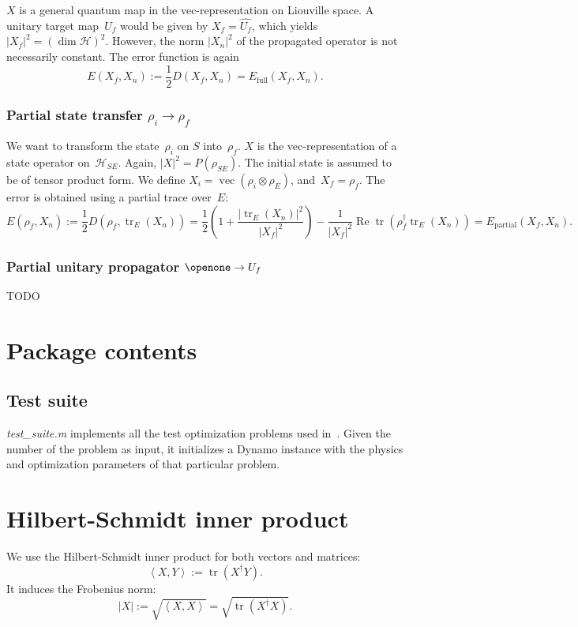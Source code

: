 \documentclass[aps, pra, a4paper, longbibliography]{revtex4}
\newcommand{\I}{\openone}
\newcommand{\be}{\begin{equation}}
\newcommand{\ee}{\end{equation}}
\newcommand{\inprod}[2]{\left\langle #1, #2 \right\rangle}
\newcommand{\hilb}[1]{\mathcal{#1}}
\DeclareMathOperator{\tr}{tr}
\DeclareMathOperator{\re}{Re}
\DeclareMathOperator{\cvec}{vec}
\begin{document}
$X$ is a general quantum map in the vec-representation on Liouville space.
A unitary target map~$U_f$ would be given by
$X_f = \hat{U_f}$, which yields $|X_f|^2 = (\dim \hilb{H})^2$.
However, the norm $|X_n|^2$ of the propagated operator
is not necessarily constant. The error function is again
\be
E(X_f, X_n)
:= \frac{1}{2} D(X_f, X_n)
= E_\text{full}(X_f, X_n).
\ee


\subsubsection{Partial state transfer $\rho_i \to \rho_f$}

We want to transform the state~$\rho_i$ on $S$ into~$\rho_f$.
$X$ is the vec-representation of a state operator on~$\hilb{H}_{SE}$.
Again, $|X|^2 = P(\rho_{SE})$.
The initial state is assumed to be of tensor product form.
We define $X_i = \cvec(\rho_i \otimes \rho_E)$,
and~$X_f = \rho_f$.
The error is obtained using a partial trace over~$E$:
\be
E(\rho_f, X_n)
:= \frac{1}{2} D(\rho_f, \tr_E(X_n))
= \frac{1}{2}\left(1 +\frac{|\tr_E(X_n)|^2}{|X_f|^2}\right)
-\frac{1}{|X_f|^2} \re \tr(\rho_f^\dagger \tr_E(X_n))
= E_\text{partial}(X_f, X_n).
\ee



\subsubsection{Partial unitary propagator $\I \to U_f$}

TODO




\section{Package contents}

\subsection{Test suite}
\emph{test\_suite.m} implements all the test optimization problems used in~\cite{machnes_2011}.
Given the number of the problem as input, it initializes a Dynamo
instance with the physics and optimization parameters of that particular problem.

\appendix
\section{Hilbert-Schmidt inner product}

We use the Hilbert-Schmidt inner product for both vectors and matrices:
\be
\inprod{X}{Y} := \tr\left(X^\dagger Y\right).
\ee
It induces the Frobenius norm:
\be
|X| := \sqrt{\inprod{X}{X}} = \sqrt{\tr\left(X^\dagger X\right)}.
\ee
\end{document}
